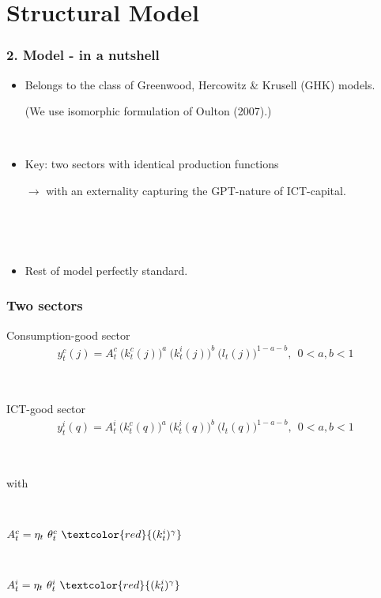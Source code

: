 \documentclass{beamer}
\begin{document}
\section{Structural Model}

\begin{frame}
	\frametitle{2. Model - in a nutshell}
	
	\begin{itemize}
	\item Belongs to the class of Greenwood, Hercowitz \& Krusell (GHK) models. 
	
	(We use isomorphic formulation of Oulton (2007).)
	
	\
	
	\item Key: two sectors with identical production functions
	\item[$\rightarrow$] with an externality capturing the GPT-nature of ICT-capital.
	
	\
	
	\
	
	\item	Rest of model perfectly standard.
	\end{itemize}
	

\end{frame}

\begin{frame}
	\frametitle{Two sectors}

Consumption-good sector
\begin{eqnarray}\label{equation:production_FINAL}
y^c_t(j) = A^c_t \ \big( k^c_{t}(j) \big)^a \ \big( k^i_{t}(j) \big)^b \ \big( l_{t}(j) \big)^{1-a-b}, \ \ 0 < a,b < 1
\end{eqnarray}

\

ICT-good sector
\begin{eqnarray}\label{equation:productionICT}
y^i_t(q) = A_t^i \ \big( k^c_{t}(q) \big)^a \ \big( k^i_{t}(q) \big)^b \ \big( l_{t}(q) \big)^{1-a-b}, \ \ 0 < a,b < 1
\end{eqnarray}

\

with 

\

\centering
$ A_t^c = \eta_t \ \theta^c_t \ \textcolor{red}{(k^i_{t})^{\gamma}}  $

\

$A_t^i = \eta_t \ \theta^i_t \ \textcolor{red}{(k^i_{t})^{\gamma}} $	

\end{frame}
\end{document}

